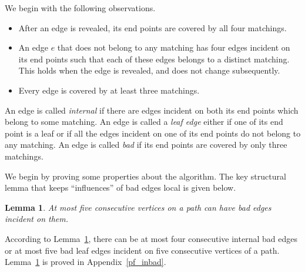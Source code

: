 \documentclass[11pt]{article}
\newtheorem{lemma}[theorem]{Lemma}
\begin{document}
  We begin with the  following observations.
\begin{itemize}
 \item After an edge is revealed, its end points are covered by all four matchings. 
 \item An edge $e$ that does not belong to any matching has four edges incident on its end points such that each of these edges
	 belongs to a distinct matching. This  holds when the edge is revealed, and does not change subsequently.
 \item Every edge is covered by at least three matchings.
\end{itemize}
An edge is called {\em internal} if there are edges incident on both its end points which belong to some matching. An edge is called a {\em leaf edge} either if one of its end point is a leaf or if all the edges incident on one of its end points do not belong to any matching. An edge is called {\em bad} if its end points are covered by only three matchings. 

We begin by proving some properties about the algorithm. The key structural lemma that keeps ``influences'' of bad edges local is given below.  
\begin{lemma}\label{internal}
 At most five consecutive vertices on a path can have bad edges incident on them.
\end{lemma}
According to Lemma~\ref{internal}, there can be at most four consecutive internal bad edges or at most five bad leaf edges incident on five consecutive vertices of a path. Lemma~\ref{internal} is proved in Appendix~\ref{pf_inbad}.
\end{document}

